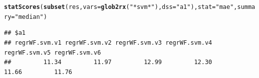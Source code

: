 \documentclass[10pt,a4paper]{article}\usepackage[]{graphicx}\usepackage[]{color}
\makeatletter
\newcommand{\hlstr}[1]{\textcolor[rgb]{0.192,0.494,0.8}{#1}}%
\newcommand{\hlstd}[1]{\textcolor[rgb]{0.345,0.345,0.345}{#1}}%
\newcommand{\hlkwc}[1]{\textcolor[rgb]{0.333,0.667,0.333}{#1}}%
\newcommand{\hlkwd}[1]{\textcolor[rgb]{0.737,0.353,0.396}{\textbf{#1}}}%
\newenvironment{kframe}{%
 \def\at@end@of@kframe{}%
 \ifinner\ifhmode%
  \def\at@end@of@kframe{\end{minipage}}%
  \begin{minipage}{\columnwidth}%
 \fi\fi%
 \def\FrameCommand##1{\hskip\@totalleftmargin \hskip-\fboxsep
 \colorbox{shadecolor}{##1}\hskip-\fboxsep
     \hskip-\linewidth \hskip-\@totalleftmargin \hskip\columnwidth}%
 \MakeFramed {\advance\hsize-\width
   \@totalleftmargin\z@ \linewidth\hsize
   \@setminipage}}%
 {\par\unskip\endMakeFramed%
 \at@end@of@kframe}
\newenvironment{knitrout}{}{} %
\makeatother
\begin{document}
\begin{knitrout}
\color{fgcolor}\begin{kframe}
\begin{alltt}
\hlkwd{statScores}\hlstd{(}\hlkwd{subset}\hlstd{(res,} \hlkwc{vars} \hlstd{=} \hlkwd{glob2rx}\hlstd{(}\hlstr{"*svm*"}\hlstd{),} \hlkwc{dss} \hlstd{=} \hlstr{"a1"}\hlstd{),} \hlkwc{stat} \hlstd{=} \hlstr{"mae"}\hlstd{,} \hlkwc{summary} \hlstd{=} \hlstr{"median"}\hlstd{)}
\end{alltt}
\begin{verbatim}
## $a1
## regrWF.svm.v1 regrWF.svm.v2 regrWF.svm.v3 regrWF.svm.v4 regrWF.svm.v5 regrWF.svm.v6 
##         11.34         11.97         12.99         12.30         11.66         11.76
\end{verbatim}
\end{kframe}
\end{knitrout}




\end{document}
